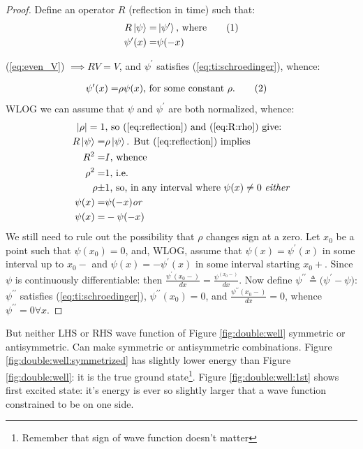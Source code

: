 \documentclass[]{article}
\newcommand\numberthis{\addtocounter{equation}{1}\tag{\theequation}}
\begin{document}
\begin{proof}
	Define an operator $R$ (reflection in time) such that:
	\begin{align*}
		R \ket{\psi} =& \ket{\psi^{\prime}} \text{, where} \numberthis \label{eq:reflection}\\
		\psi^{\prime}(x) =& \psi(-x)
	\end{align*}
	
	(\ref{eq:even_V}) $\implies RV=V$, and $\psi^{\prime}$ satisfies (\ref{eq:ti:schroedinger}), whence:
	
	\begin{align*}
	\psi^{\prime}(x) =& \rho \psi(x) \text{, for some constant $\rho$.} \numberthis \label{eq:R:rho}
	\end{align*}
	WLOG we can assume that $\psi$ and $\psi^{\prime}$ are both normalized, whence:
	\begin{align*}
		\lvert \rho \rvert = 1& \text{, so (\ref{eq:reflection}) and (\ref{eq:R:rho}) give:}\\
		R \ket{\psi} =& \rho \ket{\psi} \text{. But (\ref{eq:reflection}) implies}\\
		R^2    =& I \text{, whence}\\
		\rho^2 =& 1 \text{, i.e.}\\
		\rho \pm& 1 \text{, so, in any interval where $\psi(x)\ne 0$ \emph{either}}\\
		\psi(x) =& \psi(-x) \text{\emph{or}}\\
		\psi(x) =& -\psi(-x)
	\end{align*}
	We still need to rule out the possibility that $\rho$ changes sign at a zero. Let $x_0$ be a point such that $\psi(x_0)=0$, and, WLOG, assume that $\psi(x)=\psi^{\prime}(x)$ in some interval up to $x_0-$ and $\psi(x)=-\psi^{\prime}(x)$ in some interval starting $x_0+$. Since $\psi$ is continuously differentiable: then $\frac{\psi^{\prime}(x_0-)}{dx}=\frac{\psi^(x_0-)}{dx}$. Now define $\psi^{\prime\prime} \triangleq \big(\psi^{\prime}-\psi\big)$: $\psi^{\prime\prime}$ satisfies (\ref{eq:ti:schroedinger}), $\psi^{\prime\prime}(x_0)=0$, and $\frac{\psi^{\prime\prime}(x_0-)}{dx}=0$, whence $\psi^{\prime\prime}=0 \forall x$. 
\end{proof}

But neither LHS or RHS wave function of Figure \ref{fig:double:well} symmetric or antisymmetric. Can make symmetric or antisymmetric combinations. Figure \ref{fig:double:well:symmetrized} has slightly lower energy than Figure \ref{fig:double:well}: it is the true ground state\footnote{Remember that sign of wave function doesn't matter}. Figure \ref{fig:double:well:1st} shows first excited state: it's energy is ever so slightly larger that a wave function constrained to be on one side.
\end{document}

